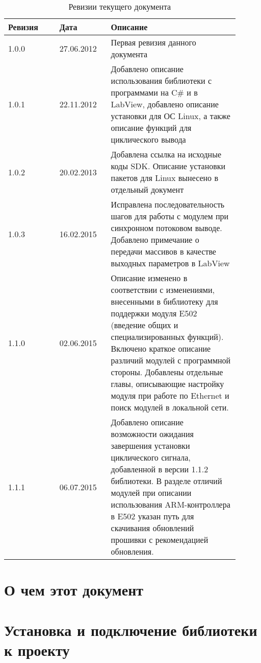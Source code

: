 \documentclass[12pt,a4paper,titlepage]{report}
\begin{document}
  
  \begin{longtable}{|m{0.2\linewidth}|m{0.2\linewidth}|m{0.5\linewidth}|}
  \caption{Ревизии текущего документа}\\\hline
  \textbf{Ревизия} & \textbf{Дата} & \textbf{Описание}\\\hline
  1.0.0            & 27.06.2012    & Первая ревизия данного документа \\\hline
  1.0.1            & 22.11.2012    & Добавлено описание использования библиотеки с программами на C\# и в LabView, добавлено описание установки для ОС Linux, а также описание функций для циклического вывода \\\hline
  1.0.2            & 20.02.2013    & Добавлена ссылка на исходные коды SDK. Описание установки пакетов для Linux вынесено в отдельный документ \\\hline
  1.0.3            & 16.02.2015    & Исправлена последовательность шагов для работы с модулем при синхронном потоковом выводе. Добавлено примечание о передачи массивов в качестве выходных параметров в LabView \\\hline
  1.1.0            & 02.06.2015    & Описание изменено в соответствии с изменениями, внесенными в библиотеку для поддержки модуля E502 (введение общих и специализированных функций). Включено краткое описание различий модулей с программной стороны. Добавлены отдельные главы, описывающие настройку модуля при работе по Ethernet и поиск модулей в локальной сети. \\\hline
  1.1.1            & 06.07.2015    & Добавлено описание возможности ожидания завершения установки циклического сигнала, добавленной в версии 1.1.2 библиотеки. В разделе отличий модулей при описании использования ARM-контроллера в E502 указан путь для скачивания обновлений прошивки с рекомендацией обновления. \\\hline
  \end{longtable}
  \newpage  
  
  \tableofcontents
  

\chapter{О чем этот документ}

\chapter{Установка и подключение библиотеки к проекту}

\end{document}
